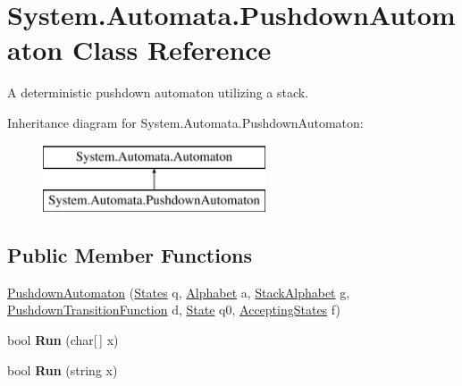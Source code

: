 \hypertarget{class_system_1_1_automata_1_1_pushdown_automaton}{}\section{System.\+Automata.\+Pushdown\+Automaton Class Reference}
\label{class_system_1_1_automata_1_1_pushdown_automaton}


A deterministic pushdown automaton utilizing a stack.  


Inheritance diagram for System.\+Automata.\+Pushdown\+Automaton\+:\begin{figure}[H]
\begin{center}
\leavevmode
\includegraphics[height=2.000000cm]{class_system_1_1_automata_1_1_pushdown_automaton}
\end{center}
\end{figure}
\subsection*{Public Member Functions}
\begin{DoxyCompactItemize}
\item 
\mbox{\hyperlink{class_system_1_1_automata_1_1_pushdown_automaton_a5cfa8067f1080fe92500ed5eb4edf147}{Pushdown\+Automaton}} (\mbox{\hyperlink{class_system_1_1_automata_1_1_states}{States}} q, \mbox{\hyperlink{class_system_1_1_automata_1_1_alphabet}{Alphabet}} a, \mbox{\hyperlink{class_system_1_1_automata_1_1_stack_alphabet}{Stack\+Alphabet}} g, \mbox{\hyperlink{class_system_1_1_automata_1_1_pushdown_transition_function}{Pushdown\+Transition\+Function}} d, \mbox{\hyperlink{class_system_1_1_automata_1_1_state}{State}} q0, \mbox{\hyperlink{class_system_1_1_automata_1_1_accepting_states}{Accepting\+States}} f)
\item 
\mbox{\label{class_system_1_1_automata_1_1_pushdown_automaton_ad54cf243b35b8991faa785678e1f069a}} 
bool {\bfseries Run} (char\mbox{[}$\,$\mbox{]} x)
\item 
\mbox{\label{class_system_1_1_automata_1_1_pushdown_automaton_a4d60ea20931e7b80526ce0105d9b667a}} 
bool {\bfseries Run} (string x)
\end{DoxyCompactItemize}
